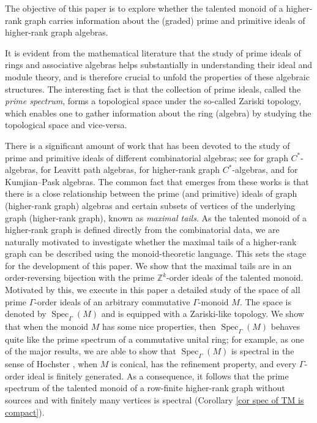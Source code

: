 \documentclass[a4paper,reqno,12pt]{amsart}
\numberwithin{equation}{section}
\theoremstyle{definition}
\theoremstyle{remark}
\newcommand{\Spec}{\operatorname{Spec}}
\begin{document}
The objective of this paper is to explore whether the talented monoid of a higher-rank graph carries information about the (graded) prime and primitive ideals of higher-rank graph algebras.

It is evident from the mathematical literature that the study of prime ideals of rings and associative algebras helps substantially in understanding their ideal and module theory, and is therefore crucial to unfold the properties of these algebraic structures. The interesting fact is that the collection of prime ideals, called the \emph{prime spectrum}, forms a topological space under the so-called Zariski topology, which enables one to gather information about the ring (algebra) by studying the topological space and vice-versa. 

There is a significant amount of work that has been devoted to the study of prime and primitive ideals of different combinatorial algebras; see \cite{BPRS, Hong} for graph $C^*$-algebras, \cite{ABR, APS} for Leavitt path algebras, \cite{KangPask} for higher-rank graph $C^*$-algebras, and \cite{Larki} for Kumjian--Pask algebras. The common fact that emerges from these works is that there is a close relationship between the prime (and primitive) ideals of graph (higher-rank graph) algebras and certain subsets of vertices of the underlying graph (higher-rank graph), known as \emph{maximal tails}. As the talented monoid of a higher-rank graph is defined directly from the combinatorial data, we are naturally motivated to investigate whether the maximal tails of a higher-rank graph can be described using the monoid-theoretic language. This sets the stage for the development of this paper. We show that the maximal tails are in an order-reversing bijection with the prime $\mathbb{Z}^k$-order ideals of the talented monoid. Motivated by this, we execute in this paper a detailed study of the space of all prime $\Gamma$-order ideals of an arbitrary commutative $\Gamma$-monoid $M$. The space is denoted by $\Spec_\Gamma(M)$ and is equipped with a Zariski-like topology. We show that when the monoid $M$ has some nice properties, then $\Spec_\Gamma(M)$ behaves quite like the prime spectrum of a commutative unital ring; for example, as one of the major results, we are able to show that $\Spec_\Gamma(M)$ is spectral in the sense of Hochster \cite{Hochster}, when $M$ is conical, has the refinement property, and every $\Gamma$-order ideal is finitely generated. As a consequence, it follows that the prime spectrum of the talented monoid of a row-finite higher-rank graph without sources and with finitely many vertices is spectral (Corollary \ref{cor spec of TM is compact}). 
\end{document}

